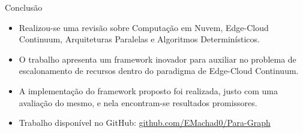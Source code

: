 \begin{frame}{Conclusão}
    \begin{itemize}
        \item Realizou-se uma revisão sobre Computação em Nuvem, Edge-Cloud Continuum, Arquiteturas Paralelas e Algoritmos Determinísticos.
        \item O trabalho apresenta um framework inovador para auxiliar no problema de escalonamento de recursos dentro do paradigma de Edge-Cloud Continuum.
        \item A implementação do framework proposto foi realizada, justo com uma avaliação do mesmo, e nela encontram-se resultados promissores.
        \item Trabalho disponível no GitHub: \url{github.com/EMachad0/Para-Graph}
    \end{itemize}
\end{frame}